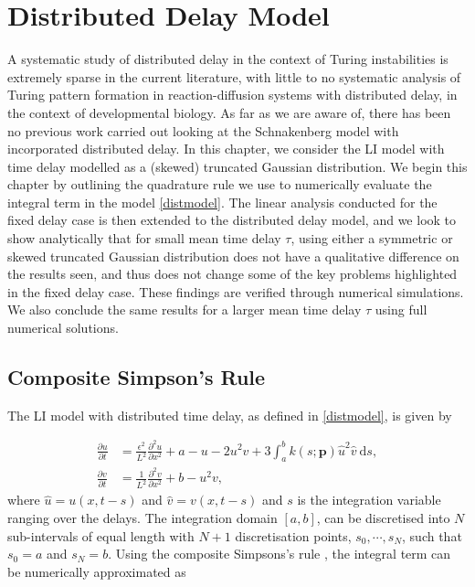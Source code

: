 \chapter{Distributed Delay Model}\label{section:distdel}
A systematic study of distributed delay in the context of Turing instabilities is extremely sparse in the current literature, with little to no systematic analysis of Turing pattern formation in reaction-diffusion systems with distributed delay, in the context of developmental biology. As far as we are aware of, there has been no previous work carried out looking at the Schnakenberg model with incorporated distributed delay. In this chapter, we consider the LI model with time delay modelled as a (skewed) truncated Gaussian distribution. We begin this chapter by outlining the quadrature rule we use to numerically evaluate the integral term in the model \eqref{distmodel}. The linear analysis conducted for the fixed delay case is then extended to the distributed delay model, and we look to show analytically that for small mean time delay $\tau$, using either a symmetric or skewed truncated Gaussian distribution does not have a qualitative difference on the results seen, and thus does not change some of the key problems highlighted in the fixed delay case. These findings are verified through numerical simulations. We also conclude the same results for a larger mean time delay $\tau$ using full numerical solutions.
\section{Composite Simpson's Rule}\label{section:quad}

The LI model with distributed time delay, as defined in \eqref{distmodel}, is given by

\begin{equation}\label{distmodel2}
  \begin{split}
    \frac{\partial u}{\partial t}&=\frac{\epsilon^2}{L^2}\frac{\partial^2u}{\partial x^2}+a-u-2u^2v+3\int_{a}^{b}k(s;\textbf{p})\hat{u}^2\hat{v} \ \text{d}s,\\
    \frac{\partial v}{\partial t}&=\frac{1}{L^2}\frac{\partial^2v}{\partial x^2}+b-u^2v,
\end{split}
\end{equation}
where $\hat{u}=u(x,t-s)$ and $\hat{v}=v(x,t-s)$ and $s$ is the integration variable ranging over the delays. The integration domain $[a, b]$, can be discretised into $N$ sub-intervals of equal length with $N+1$ discretisation points, $s_0,\cdots,s_{N}$, such that $s_0=a$ and $s_N=b$. Using the composite Simpsons's rule \cite{compsimp}, the integral term can be numerically approximated as


